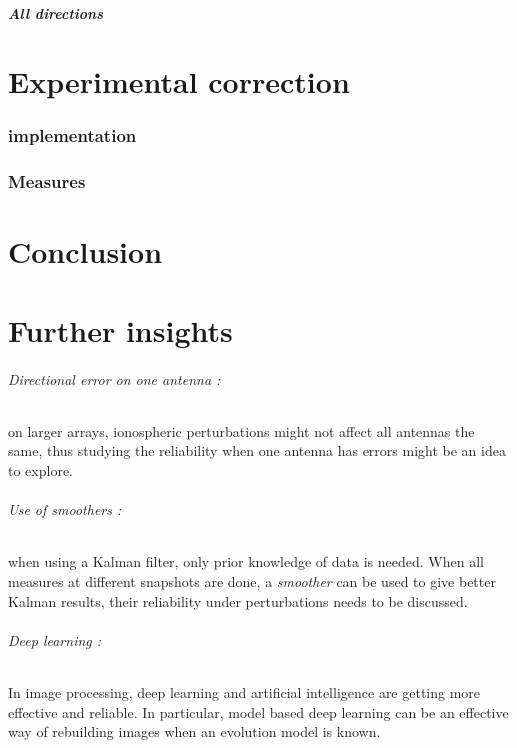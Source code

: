 \documentclass[titlepage]{article}
\begin{document}
	\subsubsection{All directions}
	
	\newpage
	\part{Experimental correction}
	\section{implementation}
	\section{Measures}
	
	\newpage
	\part{Conclusion}
	
	\newpage
	\part{Further insights}
	
	
	\paragraph{Directional error on one antenna :} on larger arrays, ionospheric perturbations might not affect all antennas the same, thus studying the reliability when one antenna has errors might be an idea to explore.
	
	\paragraph{Use of smoothers :} when using a Kalman filter, only prior knowledge of data is needed. When all measures at different snapshots are done, a \emph{smoother}\cite{RTS} can be used to give better Kalman results, their reliability under perturbations needs to be discussed. 
	
	\paragraph{Deep learning :} In image processing, deep learning and artificial intelligence are getting more effective and reliable. In particular, model based deep learning \cite{deep} can be an effective way of rebuilding images when an evolution model is known.
	
	\newpage
	\printbibliography
\end{document}
